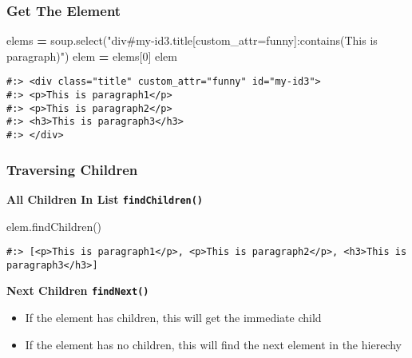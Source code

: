\documentclass[
]{book}
\newenvironment{Shaded}{\begin{snugshade}}{\end{snugshade}}
\newcommand{\DecValTok}[1]{\textcolor[rgb]{0.06,0.06,0.06}{#1}}
\newcommand{\NormalTok}[1]{#1}
\newcommand{\OperatorTok}[1]{\textcolor[rgb]{0.43,0.43,0.43}{\textbf{#1}}}
\newcommand{\StringTok}[1]{\textcolor[rgb]{0.5,0.5,0.5}{#1}}
\providecommand{\tightlist}{%
  \setlength{\itemsep}{0pt}\setlength{\parskip}{0pt}}
\begin{document}
\hypertarget{get-the-element}{%
\subsubsection{Get The Element}\label{get-the-element}}

\begin{Shaded}
\begin{Highlighting}[]
\NormalTok{elems }\OperatorTok{=}\NormalTok{ soup.select(}\StringTok{"div\#my{-}id3.title[custom\_attr=\textquotesingle{}funny\textquotesingle{}]:contains(\textquotesingle{}This is paragraph\textquotesingle{})"}\NormalTok{)}
\NormalTok{elem }\OperatorTok{=}\NormalTok{ elems[}\DecValTok{0}\NormalTok{]}
\NormalTok{elem}
\end{Highlighting}
\end{Shaded}

\begin{verbatim}
#:> <div class="title" custom_attr="funny" id="my-id3">
#:> <p>This is paragraph1</p>
#:> <p>This is paragraph2</p>
#:> <h3>This is paragraph3</h3>
#:> </div>
\end{verbatim}

\hypertarget{traversing-children}{%
\subsubsection{Traversing Children}\label{traversing-children}}

\textbf{All Children In List \texttt{findChildren()}}

\begin{Shaded}
\begin{Highlighting}[]
\NormalTok{elem.findChildren()}
\end{Highlighting}
\end{Shaded}

\begin{verbatim}
#:> [<p>This is paragraph1</p>, <p>This is paragraph2</p>, <h3>This is paragraph3</h3>]
\end{verbatim}

\textbf{Next Children \texttt{findNext()}}

\begin{itemize}
\tightlist
\item
  If the element has children, this will get the immediate child\\
\item
  If the element has no children, this will find the next element in the hierechy
\end{itemize}
\end{document}
